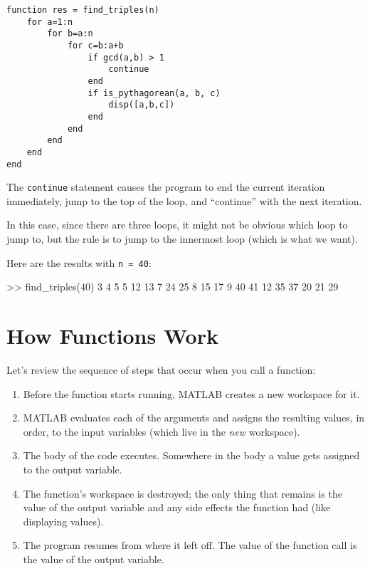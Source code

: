 \begin{lstlisting}[caption={Our final Pythagorean triples function}, label={lst:triples_function}]
function res = find_triples(n)
    for a=1:n
        for b=a:n
            for c=b:a+b
                if gcd(a,b) > 1
	                continue
                end
                if is_pythagorean(a, b, c)
                    disp([a,b,c])
                end
            end
        end
    end
end
\end{lstlisting}

The \lstinline{continue} statement  causes the program to end the current iteration
immediately, jump to the top of the loop, and ``continue'' with the next iteration.

In this case, since there are three loops, it might not be obvious which loop to jump to, but the rule is to jump to the innermost loop (which is what we want).

Here are the results with \lstinline{n = 40}:

\begin{code}
>> find_triples(40)
     3     4     5
     5    12    13
     7    24    25
     8    15    17
     9    40    41
    12    35    37
    20    21    29
\end{code}


\section{How Functions Work}

Let's review the sequence of steps that occur when you call a function:

\begin{enumerate}

\item Before the function starts running, MATLAB creates a new
workspace for it.

\item MATLAB evaluates each of the arguments and assigns
the resulting values, in order, to the input variables (which
live in the \emph{new} workspace).

\item The body of the code executes.  Somewhere in the body
a value gets assigned to the output variable.

\item The function's workspace is destroyed; the only thing
that remains is the value of the output variable and any side
effects the function had (like displaying values).

\item The program resumes from where it left off.  The value
of the function call is the value of the output variable.

\end{enumerate}

